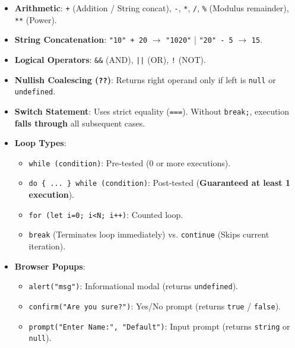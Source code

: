 \documentclass[a4paper,11pt]{article}
\begin{document}
\begin{conceptbox}
\begin{itemize}[leftmargin=*]
    \item \textbf{Arithmetic}: \texttt{+} (Addition / String concat), \texttt{-}, \texttt{*}, \texttt{/}, \texttt{\%} (Modulus remainder), \texttt{**} (Power).
    \item \textbf{String Concatenation}: \texttt{"10" + 20} $\to$ \texttt{"1020"} | \texttt{"20" - 5} $\to$ \texttt{15}.
    \item \textbf{Logical Operators}: \texttt{\&\&} (AND), \texttt{||} (OR), \texttt{!} (NOT).
    \item \textbf{Nullish Coalescing (\texttt{??})}: Returns right operand only if left is \texttt{null} or \texttt{undefined}.
\end{itemize}
\end{conceptbox}

\begin{examalert}
\begin{itemize}[leftmargin=*]
    \item \textbf{Switch Statement}: Uses strict equality (\texttt{===}). Without \texttt{break;}, execution \textbf{falls through} all subsequent cases.
    \item \textbf{Loop Types}:
    \begin{itemize}
        \item \texttt{while (condition)}: Pre-tested (0 or more executions).
        \item \texttt{do \{ ... \} while (condition)}: Post-tested (\textbf{Guaranteed at least 1 execution}).
        \item \texttt{for (let i=0; i<N; i++)}: Counted loop.
        \item \texttt{break} (Terminates loop immediately) vs. \texttt{continue} (Skips current iteration).
    \end{itemize}
    \item \textbf{Browser Popups}:
    \begin{itemize}
        \item \texttt{alert("msg")}: Informational modal (returns \texttt{undefined}).
        \item \texttt{confirm("Are you sure?")}: Yes/No prompt (returns \texttt{true} / \texttt{false}).
        \item \texttt{prompt("Enter Name:", "Default")}: Input prompt (returns \texttt{string} or \texttt{null}).
    \end{itemize}
\end{itemize}
\end{examalert}
\end{document}
